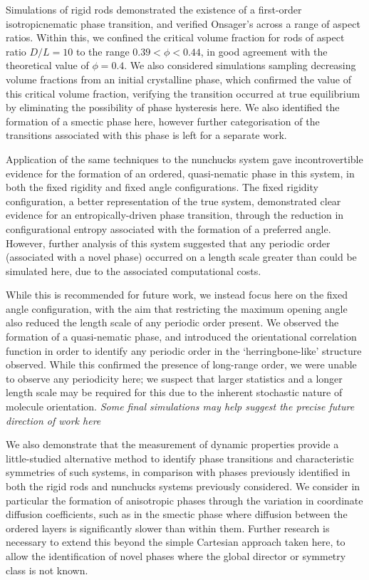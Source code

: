 \documentclass[11pt, a4paper]{article} %
\begin{document}
Simulations of rigid rods demonstrated the existence of a first-order isotropic\textendash nematic phase transition, and verified Onsager's across a range of aspect ratios. Within this, we confined the critical volume fraction for rods of aspect ratio $D/L = 10$ to the range $0.39<\phi<0.44$, in good agreement with the theoretical value of $\phi = 0.4$. We also considered simulations sampling decreasing volume fractions from an initial crystalline phase, which confirmed the value of this critical volume fraction, verifying the transition occurred at true equilibrium by eliminating the possibility of phase hysteresis here. We also identified the formation of a smectic phase here, however further categorisation of the transitions associated with this phase is left for a separate work.

Application of the same techniques to the nunchucks system gave incontrovertible evidence for the formation of an ordered, quasi-nematic phase in this system, in both the fixed rigidity and fixed angle configurations. The fixed rigidity configuration, a better representation of the true system, demonstrated clear evidence for an entropically-driven phase transition, through the reduction in configurational entropy associated with the formation of a preferred angle. However, further analysis of this system suggested that any periodic order (associated with a novel phase) occurred on a length scale greater than could be simulated here, due to the associated computational costs.

While this is recommended for future work, we instead focus here on the fixed angle configuration, with the aim that restricting the maximum opening angle also reduced the length scale of any periodic order present. We observed the formation of a quasi-nematic phase, and introduced the orientational correlation function in order to identify any periodic order in the `herringbone-like' structure observed. While this confirmed the presence of long-range order, we were unable to observe any periodicity here; we suspect that larger statistics and a longer length scale may be required for this due to the inherent stochastic nature of molecule orientation. \textit{Some final simulations may help suggest the precise future direction of work here}

We also demonstrate that the measurement of dynamic properties provide a little-studied alternative method to identify phase transitions and characteristic symmetries of such systems, in comparison with phases previously identified in both the rigid rods and nunchucks systems previously considered. We consider in particular the formation of anisotropic phases through the variation in coordinate diffusion coefficients, such as in the smectic phase where diffusion between the ordered layers is significantly slower than within them. Further research is necessary to extend this beyond the simple Cartesian approach taken here, to allow the identification of novel phases where the global director or symmetry class is not known.
\end{document}
